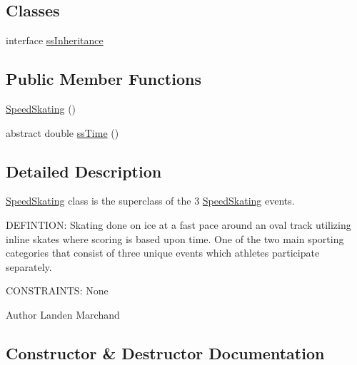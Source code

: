 \subsection*{Classes}
\begin{DoxyCompactItemize}
\item 
interface \hyperlink{interfaceProject__Codename__Olympia__v1_1_1__0_1_1SpeedSkating_1_1ssInheritance}{ss\+Inheritance}
\end{DoxyCompactItemize}
\subsection*{Public Member Functions}
\begin{DoxyCompactItemize}
\item 
\hyperlink{classProject__Codename__Olympia__v1_1_1__0_1_1SpeedSkating_af596581bdbb1d5e6a5d95cd1f887169b}{Speed\+Skating} ()
\item 
abstract double \hyperlink{classProject__Codename__Olympia__v1_1_1__0_1_1SpeedSkating_acedc7b2f1bfab95ee054531364ea50fb}{ss\+Time} ()
\end{DoxyCompactItemize}


\subsection{Detailed Description}
\hyperlink{classProject__Codename__Olympia__v1_1_1__0_1_1SpeedSkating}{Speed\+Skating} class is the superclass of the 3 \hyperlink{classProject__Codename__Olympia__v1_1_1__0_1_1SpeedSkating}{Speed\+Skating} events. 

D\+E\+F\+I\+N\+T\+I\+ON\+: Skating done on ice at a fast pace around an oval track utilizing inline skates where scoring is based upon time. One of the two main sporting categories that consist of three unique events which athletes participate separately.

C\+O\+N\+S\+T\+R\+A\+I\+N\+TS\+: None\begin{DoxyAuthor}{Author}
Landen Marchand 
\end{DoxyAuthor}


\subsection{Constructor \& Destructor Documentation}
\mbox{\label{classProject__Codename__Olympia__v1_1_1__0_1_1SpeedSkating_af596581bdbb1d5e6a5d95cd1f887169b}} 
